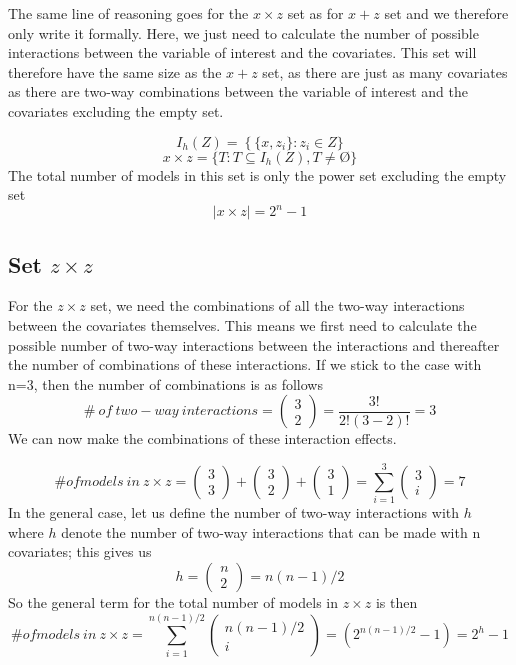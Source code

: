 The same line of reasoning goes for the $x \times z$ set as for $x + z$ set and we therefore only write it formally. Here, we just need to calculate the number of possible interactions between the variable of interest and the covariates. This set will therefore have the same size as the $x + z$ set, as there are just as many covariates as there are two-way combinations between the variable of interest and the covariates excluding the empty set.

\[I_h(Z)=\left.\left\{\{x,z_i\}\right.:z_i\in Z\right.\}\] 
\[x \times z=\left.\{T:T\subseteq I_h\left(Z\right),T\neq \textrm{\O}\right.\}\] 
The total number of models in this set is only the power set excluding the empty set
\[\left|x \times z\right|\boldsymbol{=}2^n-1\] 

\subsection{Set $z \times z$}

For the $z \times z$ set, we need the combinations of all the two-way interactions between the covariates themselves. This means we first need to calculate the possible number of two-way interactions between the interactions and thereafter the number of combinations of these interactions. If we stick to the case with n=3, then the number of combinations is as follows
\[\#\ of\ two-way\ interactions=\left( \begin{array}{c}
3 \\ 
2 \end{array}
\right)=\frac{3!}{2!\left(3-2\right)!}=3\] 
We can now make the combinations of these interaction effects. 

\noindent 
\[\# of models\ in\ z \times z=\left( \begin{array}{c}
3 \\ 
3 \end{array}
\right)+\left( \begin{array}{c}
3 \\ 
2 \end{array}
\right)+\left( \begin{array}{c}
3 \\ 
1 \end{array}
\right)=\sum^3_{i=1}{\left( \begin{array}{c}
3 \\ 
i \end{array}
\right)}=7\] 
In the general case, let us define the number of two-way interactions with $h$ where $h$  denote the number of two-way interactions that can be made with n covariates; this gives us
\[h=\left( \begin{array}{c}
n \\ 
2 \end{array}
\right)=n(n-1)/2\] 
So the general term for the total number of models in $z \times z$ is then
\[\# of models\ in\ z \times z=\sum^{n(n-1)/2}_{i=1}{\left( \begin{array}{c}
n(n-1)/2 \\ 
i \end{array}
\right)}=(2^{n(n-1)/2}-1)=2^h-1\] 


